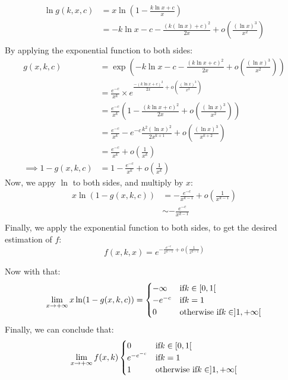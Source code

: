 \begin{align*}
	\ln g(k,x,c)&=x\ln\left(1-\frac{k\ln x+c}{x}\right)\\
	&=-k\ln x-c -\frac{(k(\ln x)+c)^2}{2x}+o\left(\frac{(\ln x)^3}{x^2}\right)\\
\end{align*}
By applying the exponential function to both sides:
\begin{align*}
	g(x,k,c)&=\exp\left(-k\ln x-c -\frac{(k\ln x+c)^2}{2x}+o\left(\frac{(\ln x)^3}{x^2}\right)\right) \\
	&=\frac{e^{-c}}{x^k}\times e^{\frac{-(k\ln x+c)^2}{2x}+o\left(\frac{(\ln x)^3}{x^2}\right)}\\
	&=\frac{e^{-c}}{x^k}\left(1-\frac{(k \ln x+c)^2}{2x}+o\left(\frac{(\ln x)^3}{x^2}\right)\right)  \\
	&=\frac{e^{-c}}{x^k}-e^{-c}\frac{k^2(\ln x)^2}{2x^{k+1}}+o\left(\frac{(\ln x)^3}{x^{k+2}}\right)\\
	&=\frac{e^{-c}}{x^k}+o\left(\frac{1}{x^k}\right)\\
	\implies 1- g(x,k,c)&=1-\frac{e^{-c}}{x^{k}} +o\left(\frac{1}{x^k}\right)
\end{align*}
Now, we appy $\ln$ to both sides, and multiply by $x:$ 
\begin{align*}
	x\ln(1-g(x,k,c))&= -\frac{e^{-c}}{x^{k-1}}+o\left(\frac{1}{x^{k-1}}\right) \\
	&\sim -\frac{e^{-c}}{x^{k-1}}  \\
\end{align*}
Finally, we apply the exponential function to both sides, to get the desired estimation of $f:$
\begin{equation}
	\label{eqn:SinklessAsymptotic}
	 f(x,k,x) = e^{-\frac{e^{-c}}{x^{k-1}}+o(\frac{1}{x^{k-1}})}
\end{equation}

Now with that:
$$
\lim_{x\rightarrow +\infty} x\ln (1-g(x,k,c))=\begin{cases}
	-\infty  & \text{if} \space k\in[0,1[ \\
	-e^{-c} & \text{if}\space k=1  \\
	0 & \text{otherwise if}\space k\in ]1,+\infty[ 
\end{cases}
$$
Finally, we can conclude that:
\begin{equation}
	\label{eqn:SinklessProbabilityLimit}
	\lim_{x\rightarrow +\infty} f(x,k)\begin{cases}
		0  & \text{if} \space k\in[0,1[ \\
		e^{-e^{-c}} & \text{if}\space k=1  \\
		1 & \text{otherwise if}\space k\in ]1,+\infty[ 
	\end{cases}
\end{equation}



